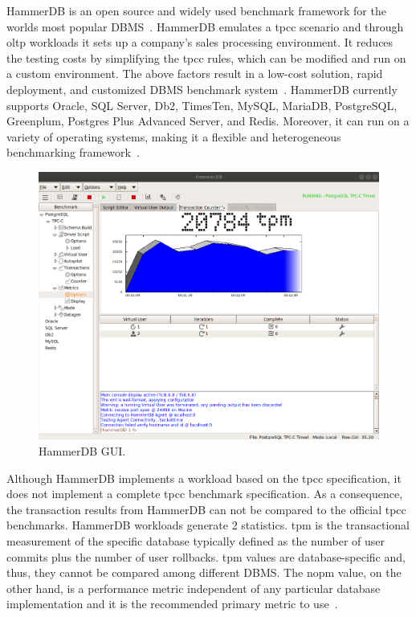
 
HammerDB is an open source and widely used benchmark framework for the worlds most popular DBMS~\cite{scalzo2018database,elgrablyanalise,knoche2016combining,benchmarkchen,ali2019persistent,yu2015design,koccak2018software,koccak2018software}.   HammerDB emulates a \gls{tpcc} scenario  and through \gls{oltp} workloads it sets up a company's sales processing environment. It reduces the testing costs by simplifying the \gls{tpcc} rules, which can be modified and run on a custom environment. The above factors result in a low-cost solution, rapid deployment, and customized DBMS benchmark system~\cite{benchmarkchen,elgrablyanalise,hammerdb}. HammerDB currently supports Oracle, SQL Server, Db2, TimesTen, MySQL, MariaDB, PostgreSQL, Greenplum, Postgres Plus Advanced Server, and Redis. Moreover, it can run on a variety of operating systems, making it a  flexible and heterogeneous benchmarking framework~\cite{benchmarkchen}.


\begin{figure}[h!]
    \centering
    \includegraphics[width=0.6\columnwidth]{Chapters/images/hammerdb1.png}
        \caption{HammerDB GUI.}
    \label{fig:hamerdbgui}
    \end{figure}

Although HammerDB implements a workload based on the \gls{tpcc} specification, it does not implement a complete \gls{tpcc} benchmark specification. As a consequence,  the transaction results from HammerDB can not be compared  to the official \gls{tpcc} benchmarks. HammerDB workloads generate 2 statistics. \gls{tpm} is the transactional measurement of the specific database typically defined as the number of user commits plus the number of user rollbacks. \gls{tpm} values are database-specific and, thus, they cannot be compared among different DBMS. The \gls{nopm} value, on the other hand, is a performance metric independent of any particular database implementation and it is the recommended primary metric to use~\cite{hammerdb}.

